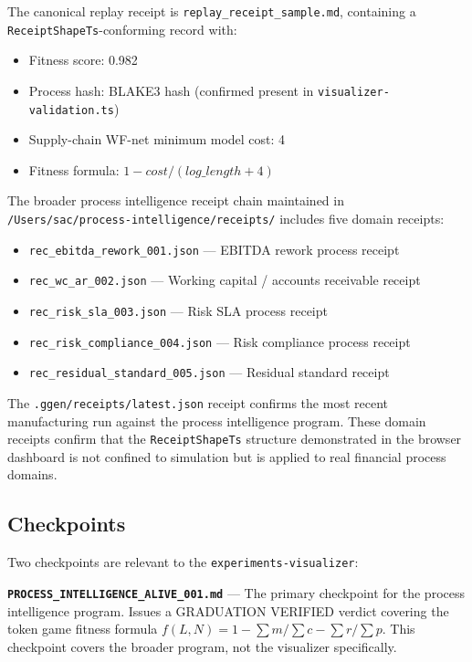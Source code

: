 The canonical replay receipt is \texttt{replay\_receipt\_sample.md}, containing a
\texttt{ReceiptShapeTs}-conforming record with:
\begin{itemize}
  \item Fitness score: 0.982
  \item Process hash: BLAKE3 hash (confirmed present in \texttt{visualizer-validation.ts})
  \item Supply-chain WF-net minimum model cost: 4
  \item Fitness formula: $1 - \mathit{cost} / (\mathit{log\_length} + 4)$
\end{itemize}

The broader process intelligence receipt chain maintained in
\texttt{/Users/sac/process-intelligence/receipts/} includes five domain receipts:
\begin{itemize}
  \item \texttt{rec\_ebitda\_rework\_001.json} — EBITDA rework process receipt
  \item \texttt{rec\_wc\_ar\_002.json} — Working capital / accounts receivable receipt
  \item \texttt{rec\_risk\_sla\_003.json} — Risk SLA process receipt
  \item \texttt{rec\_risk\_compliance\_004.json} — Risk compliance process receipt
  \item \texttt{rec\_residual\_standard\_005.json} — Residual standard receipt
\end{itemize}

The \texttt{.ggen/receipts/latest.json} receipt confirms the most recent manufacturing run
against the process intelligence program. These domain receipts confirm that the
\texttt{ReceiptShapeTs} structure demonstrated in the browser dashboard is not confined to
simulation but is applied to real financial process domains.

\subsection{Checkpoints}
\label{sec:experiments-visualizer-evidence-checkpoints}

Two checkpoints are relevant to the \texttt{experiments-visualizer}:

\textbf{\texttt{PROCESS\_INTELLIGENCE\_ALIVE\_001.md}} — The primary checkpoint for the
process intelligence program. Issues a GRADUATION VERIFIED verdict covering the token game
fitness formula $f(L,N) = 1 - \sum m / \sum c - \sum r / \sum p$. This checkpoint covers
the broader program, not the visualizer specifically.

